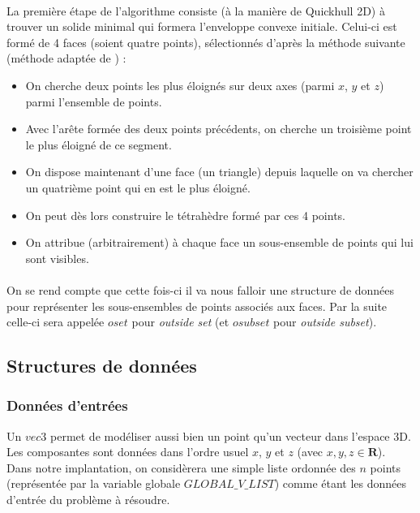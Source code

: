 \documentclass[]{article}
\begin{document}
\paragraph{}
La première étape de l'algorithme consiste (à la manière de Quickhull 2D) à trouver un solide minimal qui formera l'enveloppe convexe initiale. Celui-ci est formé de 4 faces (soient quatre points), sélectionnés d'après la méthode suivante (méthode adaptée de \cite{smith}) :
\begin{itemize}
	\item On cherche deux points les plus éloignés sur deux axes (parmi $x$, $y$ et $z$) parmi l'ensemble de points.
	\item Avec l'arête formée des deux points précédents, on cherche un troisième point le plus éloigné de ce segment.
	\item On dispose maintenant d'une face (un triangle) depuis laquelle on va chercher un quatrième point qui en est le plus éloigné.
	\item On peut dès lors construire le tétrahèdre formé par ces 4 points.
	\item On attribue (arbitrairement) à chaque face un sous-ensemble de points qui lui sont visibles.
\end{itemize}

\paragraph{}
On se rend compte que cette fois-ci il va nous falloir une structure de données pour représenter les sous-ensembles de points associés aux faces. Par la suite celle-ci sera appelée $oset$ pour \emph{outside set} (et $osubset$ pour \emph{outside subset}).

\subsection{Structures de données}
\subsubsection{Données d'entrées}
Un $vec3$ permet de modéliser aussi bien un point qu'un vecteur dans l'espace 3D. Les composantes sont données dans l'ordre usuel $x$, $y$ et $z$ (avec $x, y, z \in \mathbf{R}$).\\
Dans notre implantation, on considèrera une simple liste ordonnée des $n$ points (représentée par la variable globale $GLOBAL\_V\_LIST$) comme étant les données d'entrée du problème à résoudre.
\end{document}
